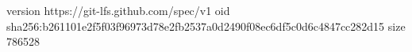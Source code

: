 version https://git-lfs.github.com/spec/v1
oid sha256:b261101e2f5f03f96973d78e2fb2537a0d2490f08ec6df5c0d6c4847cc282d15
size 786528
